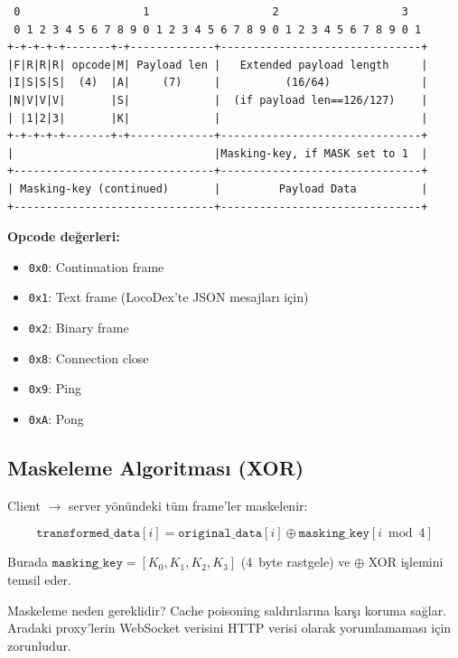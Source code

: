 \begin{lstlisting}
 0                   1                   2                   3
 0 1 2 3 4 5 6 7 8 9 0 1 2 3 4 5 6 7 8 9 0 1 2 3 4 5 6 7 8 9 0 1
+-+-+-+-+-------+-+-------------+-------------------------------+
|F|R|R|R| opcode|M| Payload len |   Extended payload length     |
|I|S|S|S|  (4)  |A|     (7)     |          (16/64)              |
|N|V|V|V|       |S|             |  (if payload len==126/127)    |
| |1|2|3|       |K|             |                               |
+-+-+-+-+-------+-+-------------+-------------------------------+
|                               |Masking-key, if MASK set to 1  |
+-------------------------------+-------------------------------+
| Masking-key (continued)       |         Payload Data          |
+-------------------------------+-------------------------------+
\end{lstlisting}

\textbf{Opcode de\u{g}erleri:}
\begin{itemize}
  \item \texttt{0x0}: Continuation frame
  \item \texttt{0x1}: Text frame (LocoDex'te JSON mesajlar{\i} i\c{c}in)
  \item \texttt{0x2}: Binary frame
  \item \texttt{0x8}: Connection close
  \item \texttt{0x9}: Ping
  \item \texttt{0xA}: Pong
\end{itemize}

\subsection{Maskeleme Algoritmas{\i} (XOR)}
\label{sec:ws-masking}

Client $\to$ server y\"{o}n\"{u}ndeki t\"{u}m frame'ler maskelenir:

\begin{equation}
\label{eq:masking}
\texttt{transformed\_data}[i] = \texttt{original\_data}[i] \oplus \texttt{masking\_key}[i \bmod 4]
\end{equation}

Burada $\texttt{masking\_key} = [K_0, K_1, K_2, K_3]$ (4~byte rastgele) ve $\oplus$ XOR i\c{s}lemini temsil eder.

\begin{dikkat}
Maskeleme neden gereklidir? Cache poisoning sald{\i}r{\i}lar{\i}na kar\c{s}{\i} koruma sa\u{g}lar. Aradaki proxy'lerin WebSocket verisini HTTP verisi olarak yorumlamamas{\i} i\c{c}in zorunludur.
\end{dikkat}


